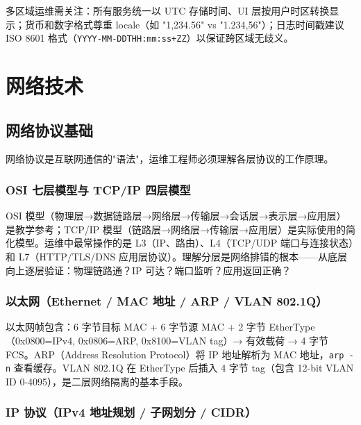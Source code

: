 \documentclass[12pt,UTF8]{ctexbook}
\begin{document}
多区域运维需关注：所有服务统一以 UTC 存储时间、UI 层按用户时区转换显示；货币和数字格式尊重 locale（如 "1,234.56" vs "1.234,56"）；日志时间戳建议 ISO 8601 格式（\verb|YYYY-MM-DDTHH:mm:ss+ZZ|）以保证跨区域无歧义。



\part{网络技术}

\chapter{网络协议基础}
\label{chap:network-protocols}

网络协议是互联网通信的"语法"，运维工程师必须理解各层协议的工作原理。

  \section{OSI 七层模型与 TCP/IP 四层模型}

OSI 模型（物理层→数据链路层→网络层→传输层→会话层→表示层→应用层）是教学参考；TCP/IP 模型（链路层→网络层→传输层→应用层）是实际使用的简化模型。运维中最常操作的是 L3（IP、路由）、L4（TCP/UDP 端口与连接状态）和 L7（HTTP/TLS/DNS 应用层协议）。理解分层是网络排错的根本——从底层向上逐层验证：物理链路通？IP 可达？端口监听？应用返回正确？

  \section{以太网（Ethernet / MAC 地址 / ARP / VLAN 802.1Q）}

以太网帧包含：6 字节目标 MAC + 6 字节源 MAC + 2 字节 EtherType（0x0800=IPv4, 0x0806=ARP, 0x8100=VLAN tag）→ 有效载荷 → 4 字节 FCS。ARP（Address Resolution Protocol）将 IP 地址解析为 MAC 地址，\verb|arp -n| 查看缓存。VLAN 802.1Q 在 EtherType 后插入 4 字节 tag（包含 12-bit VLAN ID 0-4095），是二层网络隔离的基本手段。

  \section{IP 协议（IPv4 地址规划 / 子网划分 / CIDR）}
\end{document}
